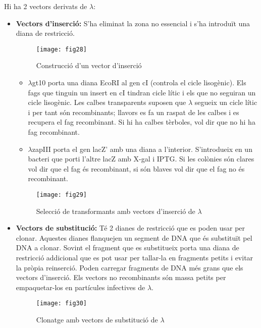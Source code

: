 Hi ha 2 vectors derivats de $\lambda$:
\begin{itemize}
\item \textbf{Vectors d'inserció:} S'ha eliminat la zona no essencial i s'ha
  introduït una diana de restricció. 

\begin{figure}[H]
  \centering
  \texttt{[image: fig28]}
  \caption{Construcció d'un vector d'inserció}
  \label{fig:fig28}
\end{figure}

  \begin{itemize}
  \item $\lambda$gt10 porta una diana
  EcoRI al gen cI (controla el cicle lisogènic). Els fags que tinguin
  un insert en cI tindran cicle lític i els que no seguiran un cicle
  lisogènic. Les calbes transparents suposen que $\lambda$ segueix un
  cicle lític i per tant són recombinants; llavors es fa un raspat de
  les calbes i es recupera el fag recombinant. Si hi ha calbes tèrboles,
  vol dir que no hi ha fag recombinant.

  \item $\lambda$zapIII porta el gen lacZ' amb una diana a
    l'interior. S'introdueix en un bacteri que porti l'altre lacZ amb
    X-gal i IPTG. Si les colònies són clares vol dir que el fag és
    recombinant, si són blaves vol dir que el fag no és recombinant.
  \end{itemize}

\begin{figure}[H]
  \centering
  \texttt{[image: fig29]}
  \caption{Selecció de transformants amb vectors d'inserció de $\lambda$}
  \label{fig:fig29}
\end{figure}

\item \textbf{Vectors de substitució:} Té 2 dianes de restricció que
  es poden usar per clonar. Aquestes dianes flanquejen un segment de
  DNA que és substituït pel DNA a clonar. Sovint el fragment que es
  substitueix porta una diana de restricció addicional que es pot usar
  per tallar-la en fragments petits i evitar la pròpia
  reinserció. Poden carregar fragments de DNA més grans que els
  vectors d'inserció. Els vectors no recombinants són massa petits per
  empaquetar-los en partícules infectives de $\lambda$.

\begin{figure}[H]
  \centering
  \texttt{[image: fig30]}
  \caption{Clonatge amb vectors de substitució de $\lambda$}
  \label{fig:fig30}
\end{figure}


\end{itemize}
